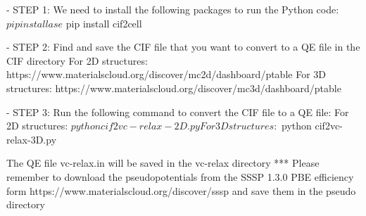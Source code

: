 - STEP 1: We need to install the following packages to run the Python code:
$ pip install ase
$ pip install cif2cell

- STEP 2: Find and save the CIF file that you want to convert to a QE file in the CIF directory
For 2D structures: https://www.materialscloud.org/discover/mc2d/dashboard/ptable
For 3D structures: https://www.materialscloud.org/discover/mc3d/dashboard/ptable

- STEP 3: Run the following command to convert the CIF file to a QE file:
For 2D structures:
$ python cif2vc-relax-2D.py
For 3D structures:
$ python cif2vc-relax-3D.py 

The QE file vc-relax.in will be saved in the vc-relax directory
*** Please remember to download the pseudopotentials from the SSSP 1.3.0 PBE efficiency form https://www.materialscloud.org/discover/sssp and save them in the pseudo directory